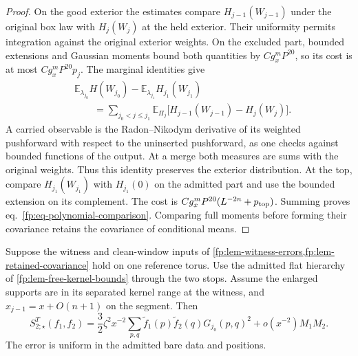 \documentclass[11pt,letterpaper,reqno]{amsart}
\makeatletter
\numberwithin{equation}{section}
\renewcommand{\eqref}[1]{\textup{eq.~\ref{#1}}}
\theoremstyle{definition}
\newcommand{\ms@minorstart}{%
  \pushQED{\qed}\renewcommand{\qedsymbol}{$\blacksquare$}}
\newenvironment{proposition}[1][]{\ms@minorstart\ms@proposition[#1]}
  {\popQED\endms@proposition}
\theoremstyle{remark}
\makeatother
\begin{document}
\begin{proof}
On the good exterior the estimates compare
\(H_{j-1}(W_{j-1})\) under the original box law with
\(H_j(W_j)\) at the held exterior. Their uniformity permits
integration against the original exterior weights. On the
excluded part, bounded extensions and Gaussian moments bound
both quantities by \(Cg_x^mP^{20}\), so its cost is at most
\(Cg_x^mP^{20}p_j\). The marginal identities give
\[
 \begin{split}
 &\mathbb E_{\lambda_{j_0}}H(W_{j_0})
       -\mathbb E_{\lambda_{j_1}}H_{j_1}(W_{j_1})\\
 &\qquad=\sum_{j_0<j\le j_1}
   \mathbb E_{\Pi_j}\bigl[H_{j-1}(W_{j-1})-H_j(W_j)\bigr].
 \end{split}
\]
A carried observable is the Radon--Nikodym derivative of its
weighted pushforward with respect to the uninserted pushforward,
as one checks against bounded functions of the output. At a
merge both measures are sums with the original weights. Thus
this identity preserves the exterior distribution. At the top,
compare \(H_{j_1}(W_{j_1})\) with \(H_{j_1}(0)\) on the admitted
part and use the bounded extension on its complement. The cost
is \(Cg_x^mP^{20}(L^{-2n}+p_{\rm top})\). Summing proves
\eqref{fp:eq-polynomial-comparison}. Comparing full moments
before forming their covariance retains the covariance of
conditional means.
\end{proof}

\begin{proposition}[The reference covariance]
\label{fp:prop-clean-reference}
Suppose the witness and clean-window inputs of
\cref{fp:lem-witness-errors,fp:lem-retained-covariance} hold on
one reference torus. Use the admitted flat hierarchy of
\cref{fp:lem-free-kernel-bounds} through the two stops.
Assume the enlarged supports are in its separated kernel
range at the witness, and $x_{j-1}=x+O(n+1)$ on the segment.
Then
\begin{equation}\label{fp:eq-reference-wilson}
 S_{2;\star}^T(f_1,f_2)
  =\frac32\zeta^2 x^{-2}
       \sum_{p,q}\widetilde f_1(p)\widetilde f_2(q)
                           G_{j_0}(p,q)^2
                +o(x^{-2}) M_1M_2 .
\end{equation}
The error is uniform in the admitted bare data and positions.
\end{proposition}
\end{document}

